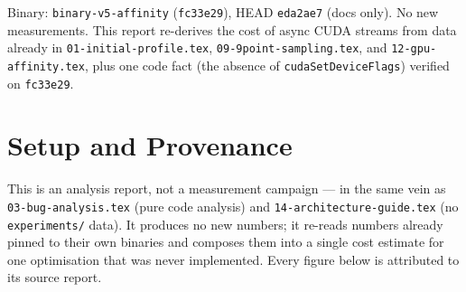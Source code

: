 \documentclass[
	english,
	letterpaper, oneside
]{article}
\begin{document}
\templatePagecfg
\templateFinalcfg

\inserttitle

\begin{center}\small\textsf{%
Binary: \texttt{binary-v5-affinity} (\texttt{fc33e29}), HEAD \texttt{eda2ae7}
(docs only). No new measurements. This report re-derives the cost
of async CUDA streams from data already in
\texttt{01-initial-profile.tex}, \texttt{09-9point-sampling.tex}, and
\texttt{12-gpu-affinity.tex}, plus one code fact (the absence of
\texttt{cudaSetDeviceFlags}) verified on \texttt{fc33e29}.%
}\end{center}

\begin{abstract}
This report revisits the asynchronous-CUDA-streams recommendation that five
prior reports (\texttt{01}, \texttt{04}, \texttt{05}, \texttt{06}, \texttt{07})
carried as ``the largest unexplored optimisation,'' and that
\texttt{09-9point-sampling.tex} began to walk back. No new run: it re-derives
the cost from the CUDA-event and \texttt{nsys} data already collected, the
per-region distribution of \texttt{12-gpu-affinity.tex}, and one code fact. The
headline: the 13.4~ms the API trace attributes to \texttt{cudaMemcpy}
is 99.8\,\% kernel-wait and only $\sim$22~\textmu s of actual
device-to-host transfer, so async streams have essentially no transfer latency
to hide. What they could reclaim is the GPU-driver thread's stall --- but
that thread busy-spins (no \texttt{cudaSetDeviceFlags}), the stall is
worth at most one 8.7~ms median CPU region, two-way SMT on the
6-core/12-thread part discounts that to $\sim$0.4 of a physical core,
and the GPU is already $\sim$91\,\% utilised so the pipeline gap is
under 9\,\%. Net: a sub-1\,\% wall lever, correctly ranked below
work-reduction. The recommendation framing in reports \texttt{01}/\texttt{04} is
retired.
\end{abstract}

\section{Setup and Provenance}

This is an analysis report, not a measurement campaign --- in the same vein as
\texttt{03-bug-analysis.tex} (pure code analysis) and
\texttt{14-architecture-guide.tex} (no \texttt{experiments/} data). It produces
no new numbers; it re-reads numbers already pinned to their own binaries and
composes them into a single cost estimate for one optimisation that was never
implemented. Every figure below is attributed to its source report.
\end{document}
